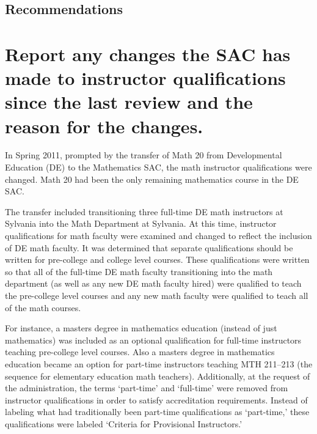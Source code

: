 \subsection{Recommendations}




\section{Report any changes the SAC has made to instructor qualifications since
the last review and the reason for the changes.}
In Spring 2011, prompted by the transfer of Math 20 from Developmental
Education (DE) to the Mathematics SAC, the math instructor qualifications were
changed.  Math 20 had been the only remaining mathematics course in the DE SAC.  

The transfer included transitioning three full-time DE math instructors at
Sylvania into the Math Department at Sylvania.  At this time, instructor
qualifications for math faculty were examined and changed to reflect the
inclusion of DE math faculty.  It was determined that separate qualifications
should be written for pre-college and college level courses.  These
qualifications were written so that all of the full-time DE math faculty
transitioning into the math department (as well as any new DE math faculty
hired) were qualified to teach the pre-college level courses and any new math
faculty were qualified to teach all of the math courses.  

For instance, a masters degree in mathematics education (instead of just
mathematics) was included as an optional qualification for full-time
instructors teaching pre-college level courses.  Also a masters degree in
mathematics education became an option for part-time instructors teaching MTH
211--213 (the sequence for elementary education math teachers).  Additionally,
at the request of the administration, the terms `part-time' and `full-time'
were removed from instructor qualifications in order to satisfy accreditation
requirements.  Instead of labeling what had traditionally been part-time
qualifications as `part-time,' these qualifications were labeled `Criteria for
Provisional Instructors.'

